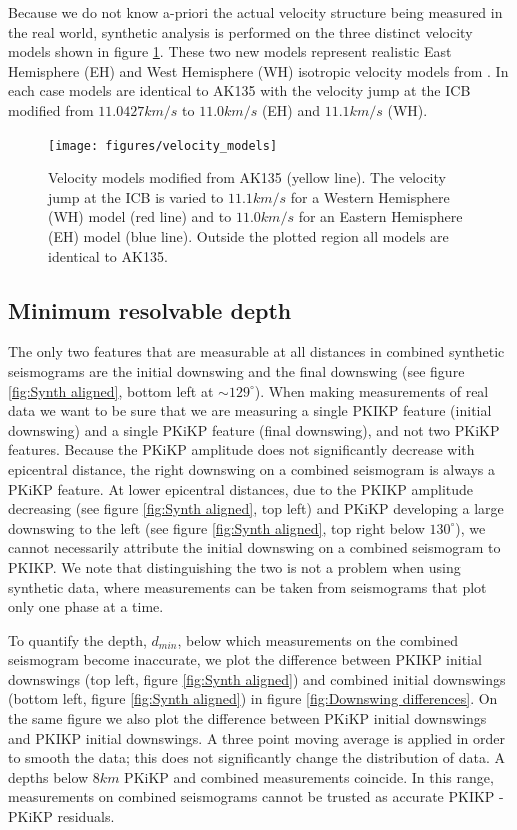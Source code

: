\documentclass[11pt,a4paper]{article}
\begin{document}
Because we do not know a-priori the actual velocity structure being measured in the real world, synthetic analysis is performed on the three distinct velocity models shown in figure \ref{fig:Velocity models}. These two new models represent realistic East Hemisphere (EH) and West Hemisphere (WH) isotropic velocity models from \cite{Waszek2011a}. In each case models are identical to AK135 with the velocity jump at the ICB modified from $11.0427 km/s$ to $11.0 km/s$ (EH) and $11.1 km/s$ (WH).

\begin{figure}
	\centering
	\texttt{[image: figures/velocity\_models]}
	\caption{Velocity models modified from AK135 (yellow line). The velocity jump at the ICB is varied to $11.1 km/s$ for a Western Hemisphere (WH) model (red line) and to $11.0 km/s$ for an Eastern Hemisphere (EH) model (blue line). Outside the plotted region all models are identical to AK135.}
	\label{fig:Velocity models}
\end{figure}

\subsection{Minimum resolvable depth}
The only two features that are measurable at all distances in combined synthetic seismograms are the initial downswing and the final downswing (see figure \ref{fig:Synth aligned}, bottom left at $\sim 129^{\circ}$). When making measurements of real data we want to be sure that we are measuring a single PKIKP feature (initial downswing) and a single PKiKP feature (final downswing), and not two PKiKP features. Because the PKiKP amplitude does not significantly decrease with epicentral distance, the right downswing on a combined seismogram is always a PKiKP feature. At lower epicentral distances, due to the PKIKP amplitude decreasing (see figure \ref{fig:Synth aligned}, top left) and PKiKP developing a large downswing to the left (see figure \ref{fig:Synth aligned}, top right below $130^{\circ}$), we cannot necessarily attribute the initial downswing on a combined seismogram to PKIKP. We note that distinguishing the two is not a problem when using synthetic data, where measurements can be taken from seismograms that plot only one phase at a time.

To quantify the depth, $d_{min}$, below which measurements on the combined seismogram become inaccurate, we plot the difference between PKIKP initial downswings (top left, figure \ref{fig:Synth aligned}) and combined initial downswings (bottom left, figure \ref{fig:Synth aligned}) in figure \ref{fig:Downswing differences}. On the same figure we also plot the difference between PKiKP initial downswings and PKIKP initial downswings. A three point moving average is applied in order to smooth the data; this does not significantly change the distribution of data. A depths below $8km$ PKiKP and combined measurements coincide. In this range, measurements on combined seismograms cannot be trusted as accurate PKIKP - PKiKP residuals.
\end{document}
